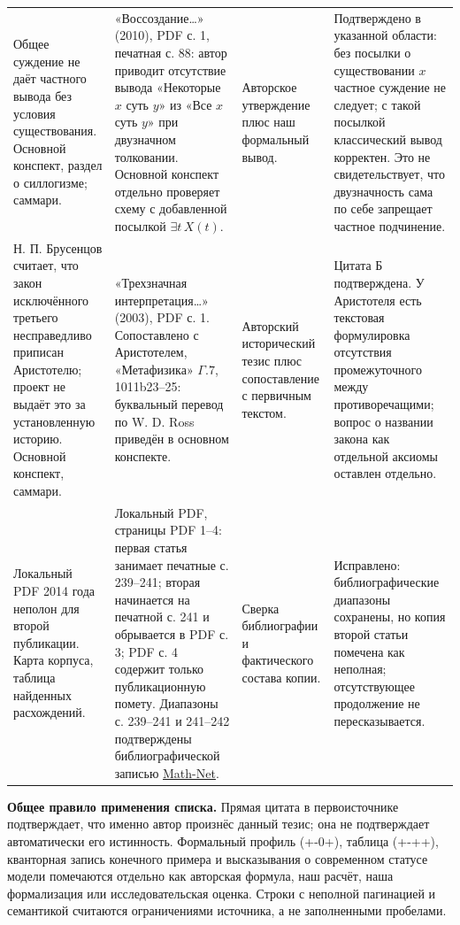 \documentclass[12pt,a4paper]{article}
\begin{document}
\begin{longtable}{P{0.13\textwidth}P{0.39\textwidth}P{0.15\textwidth}P{0.25\textwidth}}
Общее суждение не даёт частного вывода без условия существования. Основной конспект, раздел о силлогизме; саммари. & «Воссоздание…» (2010), PDF с. 1, печатная с. 88: автор приводит отсутствие вывода «Некоторые \(x\) суть \(y\)» из «Все \(x\) суть \(y\)» при двузначном толковании. Основной конспект отдельно проверяет схему с добавленной посылкой \(\exists t\,X(t)\). & Авторское утверждение плюс наш формальный вывод. & Подтверждено в указанной области: без посылки о существовании \(x\) частное суждение не следует; с такой посылкой классический вывод корректен. Это не свидетельствует, что двузначность сама по себе запрещает частное подчинение. \\
Н. П. Брусенцов считает, что закон исключённого третьего несправедливо приписан Аристотелю; проект не выдаёт это за установленную историю. Основной конспект, саммари. & «Трехзначная интерпретация…» (2003), PDF с. 1. Сопоставлено с Аристотелем, «Метафизика» \(\Gamma.7\), 1011b23–25: буквальный перевод по W. D. Ross приведён в основном конспекте. & Авторский исторический тезис плюс сопоставление с первичным текстом. & Цитата Б подтверждена. У Аристотеля есть текстовая формулировка отсутствия промежуточного между противоречащими; вопрос о названии закона как отдельной аксиомы оставлен отдельно. \\
Локальный PDF 2014 года неполон для второй публикации. Карта корпуса, таблица найденных расхождений. & Локальный PDF, страницы PDF 1–4: первая статья занимает печатные с. 239–241; вторая начинается на печатной с. 241 и обрывается в PDF с. 3; PDF с. 4 содержит только публикационную помету. Диапазоны с. 239–241 и 241–242 подтверждены библиографической записью \href{https://www.mathnet.ru/php/person.phtml?option_lang=rus\&personid=68115}{Math-Net}. & Сверка библиографии и фактического состава копии. & Исправлено: библиографические диапазоны сохранены, но копия второй статьи помечена как неполная; отсутствующее продолжение не пересказывается. \\
\bottomrule
\end{longtable}

\textbf{Общее правило применения списка.} Прямая цитата в первоисточнике подтверждает, что именно автор произнёс данный тезис; она не подтверждает автоматически его истинность. Формальный профиль (+-0+), таблица (+-++), кванторная запись конечного примера и высказывания о современном статусе модели помечаются отдельно как авторская формула, наш расчёт, наша формализация или исследовательская оценка. Строки с неполной пагинацией и семантикой считаются ограничениями источника, а не заполненными пробелами.
\end{document}
